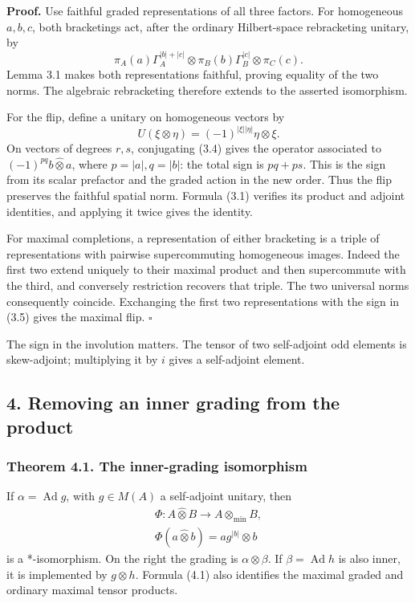 \documentclass[
  11pt,
]{article}
\begin{document}
\textbf{Proof.} Use faithful graded representations of all three
factors. For homogeneous \(a,b,c\), both bracketings act, after the
ordinary Hilbert-space rebracketing unitary, by \[
\pi_A(a)\Gamma_A^{|b|+|c|}
\otimes\pi_B(b)\Gamma_B^{|c|}
\otimes\pi_C(c).
\tag{3.6}
\] Lemma 3.1 makes both representations faithful, proving equality of
the two norms. The algebraic rebracketing therefore extends to the
asserted isomorphism.

For the flip, define a unitary on homogeneous vectors by \[
U(\xi\otimes\eta)=(-1)^{|\xi||\eta|}\eta\otimes\xi.
\] On vectors of degrees \(r,s\), conjugating (3.4) gives the operator
associated to \((-1)^{pq}b\widehat\otimes a\), where \(p=|a|,q=|b|\):
the total sign is \(pq+ps\). This is the sign from its scalar prefactor
and the graded action in the new order. Thus the flip preserves the
faithful spatial norm. Formula (3.1) verifies its product and adjoint
identities, and applying it twice gives the identity.

For maximal completions, a representation of either bracketing is a
triple of representations with pairwise supercommuting homogeneous
images. Indeed the first two extend uniquely to their maximal product
and then supercommute with the third, and conversely restriction
recovers that triple. The two universal norms consequently coincide.
Exchanging the first two representations with the sign in (3.5) gives
the maximal flip. \(\square\)

The sign in the involution matters. The tensor of two self-adjoint odd
elements is skew-adjoint; multiplying it by \(i\) gives a self-adjoint
element.

\subsection{4. Removing an inner grading from the
product}\label{removing-an-inner-grading-from-the-product}

\subsubsection{Theorem 4.1. The inner-grading
isomorphism}\label{theorem-4.1.-the-inner-grading-isomorphism}

If \(\alpha=\operatorname{Ad}g\), with \(g\in M(A)\) a self-adjoint
unitary, then \[
\begin{gathered}
\Phi:A\widehat\otimes B\longrightarrow A\otimes_{\min}B,
\\
\Phi(a\widehat\otimes b)=ag^{|b|}\otimes b
\end{gathered}
\tag{4.1}
\] is a *-isomorphism. On the right the grading is
\(\alpha\otimes\beta\). If \(\beta=\operatorname{Ad}h\) is also inner,
it is implemented by \(g\otimes h\). Formula (4.1) also identifies the
maximal graded and ordinary maximal tensor products.
\end{document}
